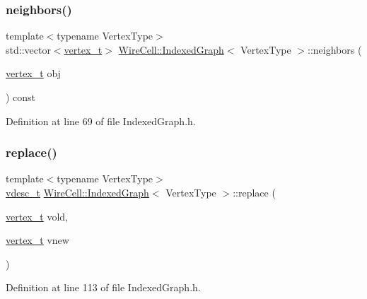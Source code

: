 \subsubsection{\texorpdfstring{neighbors()}{neighbors()}}
{\footnotesize\ttfamily template$<$typename Vertex\+Type$>$ \\
std\+::vector$<$\hyperlink{class_wire_cell_1_1_indexed_graph_ac26b25ac103373dde929a982d948d1b5}{vertex\+\_\+t}$>$ \hyperlink{class_wire_cell_1_1_indexed_graph}{Wire\+Cell\+::\+Indexed\+Graph}$<$ Vertex\+Type $>$\+::neighbors (\begin{DoxyParamCaption}\item[{\hyperlink{class_wire_cell_1_1_indexed_graph_ac26b25ac103373dde929a982d948d1b5}{vertex\+\_\+t}}]{obj }\end{DoxyParamCaption}) const\hspace{0.3cm}{\ttfamily [inline]}}



Definition at line 69 of file Indexed\+Graph.\+h.

\mbox{\label{class_wire_cell_1_1_indexed_graph_a1c2b3474d425594b43dea46c975a27f4}} 
\subsubsection{\texorpdfstring{replace()}{replace()}}
{\footnotesize\ttfamily template$<$typename Vertex\+Type$>$ \\
\hyperlink{class_wire_cell_1_1_indexed_graph_a8bad4d4e6f2d8a8109e95757d502c9ba}{vdesc\+\_\+t} \hyperlink{class_wire_cell_1_1_indexed_graph}{Wire\+Cell\+::\+Indexed\+Graph}$<$ Vertex\+Type $>$\+::replace (\begin{DoxyParamCaption}\item[{\hyperlink{class_wire_cell_1_1_indexed_graph_ac26b25ac103373dde929a982d948d1b5}{vertex\+\_\+t}}]{vold,  }\item[{\hyperlink{class_wire_cell_1_1_indexed_graph_ac26b25ac103373dde929a982d948d1b5}{vertex\+\_\+t}}]{vnew }\end{DoxyParamCaption})\hspace{0.3cm}{\ttfamily [inline]}}



Definition at line 113 of file Indexed\+Graph.\+h.

